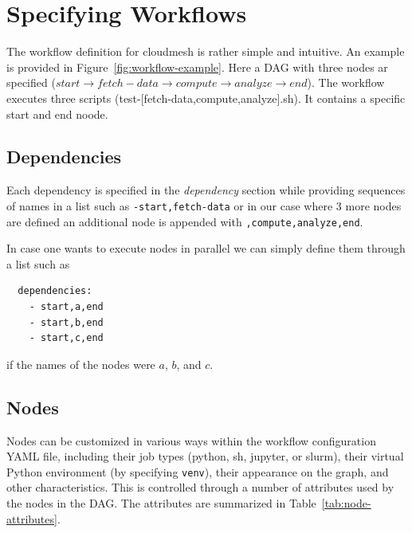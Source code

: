 
\section{Specifying Workflows}\label{specifying-workflows}

The workflow definition for cloudmesh is rather simple and intuitive.
An example is provided in Figure~\ref{fig:workflow-example}.  Here a
DAG with three nodes ar specified ($start \rightarrow fetch-data \rightarrow
compute \rightarrow analyze \rightarrow end $). The workflow executes three
scripts (test-[fetch-data,compute,analyze].sh). It contains a specific start and end noode.

\subsection{Dependencies}

Each dependency is specified in the {\em dependency} section while
providing sequences of names in a list such as
\verb|-start,fetch-data| or in our case where 3 more nodes are defined an
additional node is appended with \verb|,compute,analyze,end|.

In case one wants to execute nodes in parallel we can simply define
them through a list such as 

\begin{verbatim}
  dependencies:
    - start,a,end
    - start,b,end
    - start,c,end
\end{verbatim}

if the names of the nodes were $a$, $b$, and $c$. 


\subsection{Nodes}

Nodes can be customized in various ways within the workflow
configuration YAML file, including their job types (python, sh, jupyter,
or slurm), their virtual Python environment (by specifying
\texttt{venv}), their appearance on the graph, and other
characteristics. This is controlled through a number of attributes
used by the nodes in the DAG. The attributes are summarized in
Table~\ref{tab:node-attributes}.


